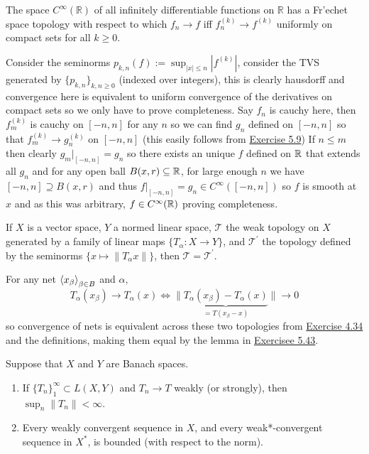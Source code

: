 \documentclass[12pt,a4paper]{article}
\begin{document}
\begin{problem}\label{prob:5-45}
The space $C^\infty(\mathbb{R})$ of all infinitely differentiable functions on $\mathbb{R}$ has a Fr'{e}chet space topology with respect to which $f_n \rightarrow f$ iff $f_n^{(k)} \rightarrow f^{(k)}$ uniformly on compact sets for all $k \ge 0$.
\end{problem}
\begin{solution}
    Consider the seminorms $p_{k,n}(f):=\sup_{|x|\leq n}|f^{(k)}|$, consider the TVS generated by $\{p_{k,n}\}_{k,n\geq 0}$ (indexed over integers), this is clearly hausdorff and convergence here is equivalent to uniform convergence of the derivatives on compact sets so we only have to prove completeness. 
    Say $f_n$ is cauchy here, then $f_m^{(k)}$ is cauchy on $[-n,n]$ for any $n$ so we can find $g_n$ defined on $[-n,n]$ so that $f_m^{(k)}\to g_n^{(k)}$ on $[-n,n]$ (this easily follows from \hyperref[prob:5-9]{Exercise 5.9}) 
    If $n\leq m$ then clearly $g_m|_{[-n,n]}=g_n$ so there exists an unique $f$ defined on $\mathbb{R}$ that extends all $g_n$ and for any open ball $B(x,r) \subseteq\mathbb{R}$, for large enough $n$ we have $[-n,n] \supseteq B(x,r)$ and thus $f|_{[-n,n]}=g_n\in C^\infty([-n,n])$ so $f$ is smooth at $x$ and as this was arbitrary, $f\in C^\infty(\mathbb{R})$ proving completeness.  
\end{solution}
\begin{problem}\label{prob:5-46}
If $X$ is a vector space, $Y$ a normed linear space, $\mathcal{T}$ the weak topology on $X$ generated by a family of linear maps $\{T_\alpha : X \rightarrow Y\}$, and $\mathcal{T}^\prime$ the topology defined by the seminorms $\{x \mapsto \|T_\alpha x\|\}$, then $\mathcal{T} = \mathcal{T}^\prime$.
\end{problem}
\begin{solution}
    For any net $\left\langle x_\beta\right\rangle_{\beta\in B}$ and $\alpha,$
    \[
        T_\alpha(x_\beta)\longrightarrow T_\alpha(x)\iff \|\underbrace{T_\alpha(x_\beta)-T_\alpha(x)}_{=T(x_\beta-x)}\|\longrightarrow 0
    \]
    so convergence of nets is equivalent across these two topologies from \hyperref[prob:4-34]{Exercise 4.34} and the definitions, making them equal by the lemma in \hyperref[prob:5-43]{Exercisee 5.43}.
\end{solution}
\begin{problem}\label{prob:5-47}
Suppose that $X$ and $Y$ are Banach spaces.
\begin{enumerate}[label=\alph*.]
\item If $\{T_n\}_{1}^{\infty} \subset L(X,Y)$ and $T_n \rightarrow T$ weakly (or strongly), then $\sup_n \|T_n\| < \infty$.
\item Every weakly convergent sequence in $X$, and every weak*-convergent sequence in $X^*$, is bounded (with respect to the norm).
\end{enumerate}
\end{problem}
\end{document}

